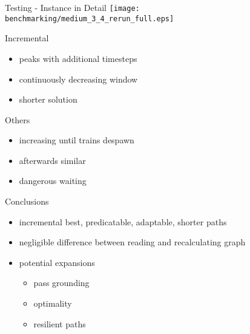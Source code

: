 \begin{frame}{Testing - Instance in Detail}
    \texttt{[image: benchmarking/medium\_3\_4\_rerun\_full.eps]}
    \begin{minipage}{0.5\textwidth}
        Incremental
        \begin{itemize}
            \item peaks with additional timesteps
            \item continuously decreasing window
            \item shorter solution
        \end{itemize}
    \end{minipage}%
    \begin{minipage}{0.5\textwidth}
        Others
        \begin{itemize}
            \item increasing until trains despawn
            \item afterwards similar
            \item dangerous waiting
        \end{itemize}
    \end{minipage}
\end{frame}
 
\begin{frame}{Conclusions}
    \begin{itemize}
        \item incremental best, predicatable, adaptable, shorter paths
        \item negligible difference between reading and recalculating graph
        \item potential expansions
        \begin{itemize}
        \item pass grounding
        \item optimality
        \item resilient paths
        \end{itemize}
    \end{itemize}
\end{frame}